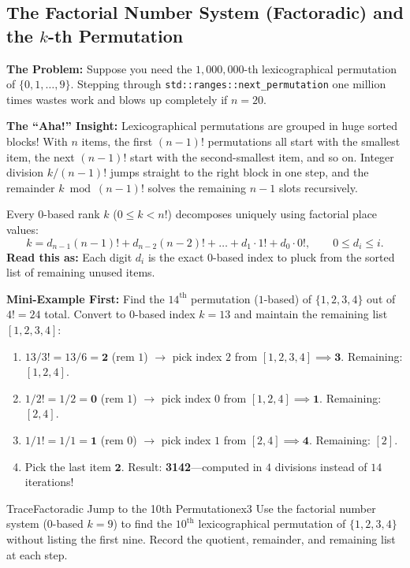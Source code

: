 \documentclass[11pt,a4paper]{article}
\theoremstyle{definition}
\newcommand{\painbeat}{\textbf{\color{accentamber}The Problem:} }
\newcommand{\ahabeat}{\textbf{\color{accentteal}The ``Aha!'' Insight:} }
\newcommand{\examplebeat}{\textbf{\color{primaryblue}Mini-Example First:} }
\begin{document}
\subsection{The Factorial Number System (Factoradic) and the $k$-th Permutation}

\painbeat Suppose you need the $1{,}000{,}000$-th lexicographical permutation of $\{0, 1, \dots, 9\}$. Stepping through \texttt{std::ranges::next\_permutation} one million times wastes work and blows up completely if $n = 20$.

\ahabeat Lexicographical permutations are grouped in huge sorted blocks! With $n$ items, the first $(n - 1)!$ permutations all start with the smallest item, the next $(n - 1)!$ start with the second-smallest item, and so on. Integer division $k / (n - 1)!$ jumps straight to the right block in one step, and the remainder $k \bmod (n - 1)!$ solves the remaining $n - 1$ slots recursively.

\begin{formulabox}
Every $0$-based rank $k$ ($0 \le k < n!$) decomposes uniquely using factorial place values:
\[
    k = d_{n-1}(n-1)! + d_{n-2}(n-2)! + \dots + d_1 \cdot 1! + d_0 \cdot 0!, \qquad 0 \le d_i \le i.
\]
\textbf{Read this as:} Each digit $d_i$ is the exact $0$-based index to pluck from the sorted list of remaining unused items.
\end{formulabox}

\examplebeat Find the $14^{\text{th}}$ permutation ($1$-based) of $\{1, 2, 3, 4\}$ out of $4! = 24$ total. Convert to $0$-based index $k = 13$ and maintain the remaining list $[1, 2, 3, 4]$:
\begin{enumerate}
    \item $13 / 3! = 13 / 6 = \mathbf{2}$ (rem $1$) $\to$ pick index $2$ from $[1, 2, 3, 4] \implies \mathbf{3}$. Remaining: $[1, 2, 4]$.
    \item $1 / 2! = 1 / 2 = \mathbf{0}$ (rem $1$) $\to$ pick index $0$ from $[1, 2, 4] \implies \mathbf{1}$. Remaining: $[2, 4]$.
    \item $1 / 1! = 1 / 1 = \mathbf{1}$ (rem $0$) $\to$ pick index $1$ from $[2, 4] \implies \mathbf{4}$. Remaining: $[2]$.
    \item Pick the last item $\mathbf{2}$. Result: \textbf{3142}---computed in $4$ divisions instead of $14$ iterations!
\end{enumerate}

\begin{tryitbox}{Trace}{Factoradic Jump to the 10th Permutation}{ex3}
Use the factorial number system ($0$-based $k = 9$) to find the $10^{\text{th}}$ lexicographical permutation of $\{1, 2, 3, 4\}$ without listing the first nine. Record the quotient, remainder, and remaining list at each step.
\end{tryitbox}
\end{document}
